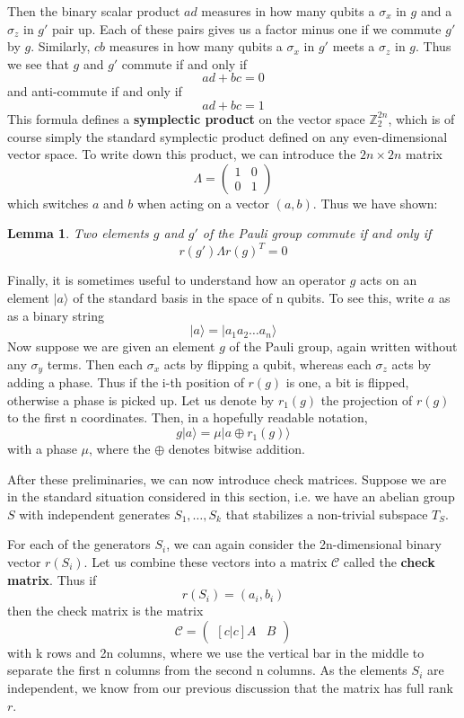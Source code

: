 \documentclass[a4paper, draft]{article}
\theoremstyle{own}
\newtheorem{lem}[thm]{Lemma}
\theoremstyle{remark}
\newcommand{\Z}{\mathbb{Z}}
\begin{document}
Then the binary scalar product $ad$ measures in how many qubits a $\sigma_x$ in $g$ and a $\sigma_z$ in $g'$ pair up. Each of these pairs gives us a factor minus one if we commute $g'$ by $g$. Similarly, $cb$ measures in how many qubits a $\sigma_x$ in $g'$ meets a $\sigma_z$ in $g$. Thus we see that $g$ and $g'$ commute if and only if
$$
ad + bc = 0
$$
and anti-commute if and only if
$$
ad + bc = 1
$$
This formula defines a {\bf symplectic product} on the vector space $\Z_2^{2n}$, which is of course simply the standard symplectic product defined on any even-dimensional vector space. To write down this product, we can introduce the $2n \times 2n$ matrix
$$
\Lambda = \begin{pmatrix} 
1 & 0 \\
0 & 1
\end{pmatrix}
$$
which switches $a$ and $b$ when acting on a vector $(a,b)$. Thus we have shown:

\begin{lem}
Two elements $g$ and $g'$ of the Pauli group commute if and only if
$$
r(g') \Lambda r(g)^T = 0
$$
\end{lem}

Finally, it is sometimes useful to understand how an operator $g$ acts on an element $|a \rangle$ of the standard basis in the space of n qubits. To see this, write $a$ as as a binary string
$$
|a \rangle = |a_1 a_2 \dots a_n \rangle
$$
Now suppose we are given an element $g$ of the Pauli group, again written without any $\sigma_y$ terms. Then each $\sigma_x$ acts by flipping a qubit, whereas each $\sigma_z$ acts by adding a phase. Thus if the i-th position of $r(g)$ is one, a bit is flipped, otherwise a phase is picked up. Let us denote by $r_1(g)$ the projection of $r(g)$ to the first n coordinates. Then, in a hopefully readable notation,
$$
g |a \rangle = \mu  | a \oplus r_1(g) \rangle
$$
with a phase $\mu$, where the $\oplus$ denotes bitwise addition. 


After these preliminaries, we can now introduce check matrices. Suppose we are in the standard situation considered in this section, i.e. we have an abelian group $S$ with independent generates $S_1, \dots, S_k$ that stabilizes a non-trivial subspace $T_S$. 

For each of the generators $S_i$, we can again consider the 2n-dimensional binary vector $r(S_i)$. Let us combine these vectors into a matrix $\mathcal{C}$ called the {\bf check matrix}. Thus if
$$
r(S_i)  = (a_i, b_i)
$$
then the check matrix is the matrix 
$$
\mathcal{C} = 
\begin{pmatrix}[c|c]
A & B
\end{pmatrix}
$$
with k rows and 2n columns, where we use the vertical bar in the middle to separate the first n columns from the second n columns. As the elements $S_i$ are independent, we know from our previous discussion that the matrix has full rank $r$.
\end{document}
